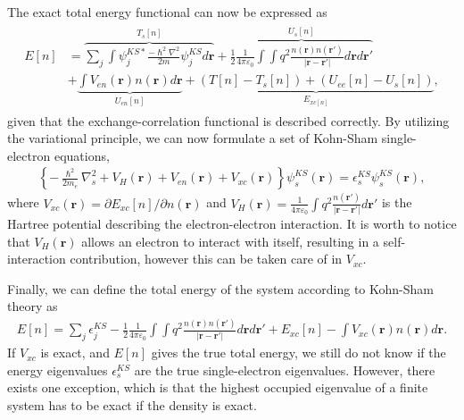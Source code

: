 The exact total energy functional can now be expressed as
\begin{align}
  \begin{aligned}
  E[n]
  &= \overbrace{\sum_j \int \psi_j^{KS*} \frac{-\hslash^2\nabla^2}{2m} \psi_j^{KS}d\boldsymbol{r}}^{T_s[n]} + \overbrace{\frac{1}{2}\frac{1}{4\pi\varepsilon_0}\int \int q^2\frac{n(\boldsymbol{r})n(\boldsymbol{r}')}{\lvert \boldsymbol{r}-\boldsymbol{r}'\rvert} d\boldsymbol{r}d\boldsymbol{r}'}^{U_s[n]}
  \\ &+ \underbrace{\int V_{en}(\boldsymbol{r})n(\boldsymbol{r})d\boldsymbol{r}}_{U_{en}[n]} + \underbrace{\left(T[n] - T_s[n] \right) + \left( U_{ee}[n] - U_s[n] \right)}_{E_{xc[n]}},
  \end{aligned}
\end{align}
given that the exchange-correlation functional is described correctly. By utilizing the variational principle, we can now formulate a set of Kohn-Sham single-electron equations,
\begin{align}
  \left\{ -\frac{\hslash^2}{2m_e}\nabla^2_s + V_H(\boldsymbol{r}) + V_{en}(\boldsymbol{r}) + V_{xc}(\boldsymbol{r}) \right\} \psi_s^{KS}(\boldsymbol{r}) = \epsilon_s^{KS} \psi_s^{KS}(\boldsymbol{r}),
  \label{eq:singleKS}
\end{align}
where $V_{xc}(\boldsymbol{r})=\partial E_{xc}[n]/\partial n(\boldsymbol{r})$ and $V_{H}(\boldsymbol{r})=\frac{1}{4\pi\varepsilon_0}\int q^2 \frac{n(\boldsymbol{r'})}{\lvert \boldsymbol{r} - \boldsymbol{r}'\rvert} d\boldsymbol{r}'$ is the Hartree potential describing the electron-electron interaction.
It is worth to notice that $V_H(\boldsymbol{r})$ allows an electron to interact with itself, resulting in a self-interaction contribution, however this can be taken care of in $V_{xc}$.

Finally, we can define the total energy of the system according to Kohn-Sham theory as
\begin{align}
  E[n] = \sum_{j}\epsilon_j^{KS}-\frac{1}{2}\frac{1}{4\pi\varepsilon_0}\int \int q^2 \frac{n(\boldsymbol{r})n(\boldsymbol{r}')}{\lvert \boldsymbol{r} - \boldsymbol{r}' \rvert} d\boldsymbol{r}d\boldsymbol{r}' + E_{xc}[n] - \int V_{xc}(\boldsymbol{r})n(\boldsymbol{r})d\boldsymbol{r}.
\end{align}
If $V_{xc}$ is exact, and $E[n]$ gives the true total energy, we still do not know if the energy eigenvalues $\epsilon_s^{KS}$ are the true single-electron eigenvalues. However, there exists one exception, which is that the highest occupied eigenvalue of a finite system has to be exact if the density is exact.

